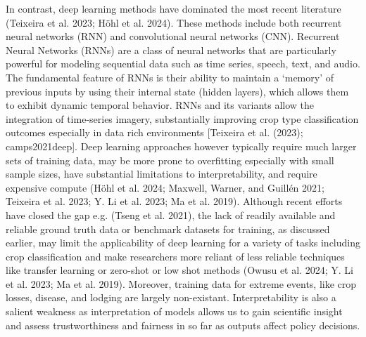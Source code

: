 \documentclass[
  journal,
  twocolumn]{IEEEtran}
\begin{document}
In contrast, deep learning methods have dominated the most recent
literature (Teixeira et al. 2023; Höhl et al. 2024). These methods
include both recurrent neural networks (RNN) and convolutional neural
networks (CNN). Recurrent Neural Networks (RNNs) are a class of neural
networks that are particularly powerful for modeling sequential data
such as time series, speech, text, and audio. The fundamental feature of
RNNs is their ability to maintain a `memory' of previous inputs by using
their internal state (hidden layers), which allows them to exhibit
dynamic temporal behavior. RNNs and its variants allow the integration
of time-series imagery, substantially improving crop type classification
outcomes especially in data rich environments {[}Teixeira et al. (2023);
camps2021deep{]}. Deep learning approaches however typically require
much larger sets of training data, may be more prone to overfitting
especially with small sample sizes, have substantial limitations to
interpretability, and require expensive compute (Höhl et al. 2024;
Maxwell, Warner, and Guillén 2021; Teixeira et al. 2023; Y. Li et al.
2023; Ma et al. 2019). Although recent efforts have closed the gap e.g.
(Tseng et al. 2021), the lack of readily available and reliable ground
truth data or benchmark datasets for training, as discussed earlier, may
limit the applicability of deep learning for a variety of tasks
including crop classification and make researchers more reliant of less
reliable techniques like transfer learning or zero-shot or low shot
methods (Owusu et al. 2024; Y. Li et al. 2023; Ma et al. 2019).
Moreover, training data for extreme events, like crop losses, disease,
and lodging are largely non-existant. Interpretability is also a salient
weakness as interpretation of models allows us to gain scientific
insight and assess trustworthiness and fairness in so far as outputs
affect policy decisions.
\end{document}
